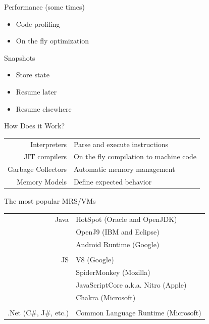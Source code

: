 \documentclass[
14pt,
aspectratio=169,
usenames,
dvipsnames,
x11names]{beamer}
\begin{document}
\begin{frame}{Performance (some times)}
  \begin{itemize}  \setlength{\itemsep}{\fill}
  \item Code profiling
  \item On the fly optimization
  \end{itemize}
\end{frame}

\begin{frame}{Snapshots}
  \begin{itemize}  \setlength{\itemsep}{\fill}
  \item Store state
  \item Resume later
  \item Resume elsewhere
  \end{itemize}
\end{frame}

\begin{frame}{How Does it Work?}
  \def\arraystretch{2}
  \centering
  \begin{tabular}{r l}
   \alert{Interpreters}       & Parse and execute instructions \\
   \alert{JIT compilers}      & On the fly compilation to machine code \\
   \alert{Garbage Collectors} & Automatic memory management \\
   \alert{Memory Models}      & Define expected behavior
  \end{tabular}
\end{frame}

\begin{frame}{The most popular MRS/VMs}
  \centering
  \begin{tabular}{r l}
   \alert{Java}                  & HotSpot (Oracle and OpenJDK)        \\
                                 & OpenJ9 (IBM and Eclipse)            \\
                                 & Android Runtime (Google)            \\
                                                                       \\
   \alert{JS}                    & V8 (Google)                         \\
                                 & SpiderMonkey (Mozilla)              \\
                                 & JavaScriptCore a.k.a. Nitro (Apple) \\
                                 & Chakra (Microsoft)                  \\
                                                                       \\
   \alert{.Net (C\#, J\#, etc.)} & Common Language Runtime (Microsoft) \\
  \end{tabular}
\end{frame}
\end{document}
